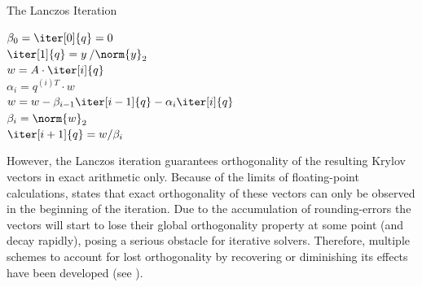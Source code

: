 \begin{algorithm}[h]
  \caption{The Lanczos Iteration}
  \label{alg:lanczos}
  \SetAlgoLined
  $\beta_0= \iter[0]{q} =0 $\\
  $\iter[1]{q}= y\:/\norm{y}_2$ \\
   {
    $w =A\cdot \iter[i]{q}$ \\
    $\alpha_i = q^{(i)T}\cdot w$ \\
    $w = w -\beta_{i-1}\iter[i-1]{q}-\alpha_i\iter[i]{q}$ \\
    $\beta_i = \norm{w}_2$ \\
    $\iter[i+1]{q} = w/\beta_i$
  }
\end{algorithm}

However, the Lanczos iteration guarantees orthogonality of the resulting Krylov vectors in exact arithmetic only. Because of the limits of floating-point calculations, \cite{saad_gmres_1986} states that exact orthogonality of these vectors can only be observed in the beginning of the iteration. Due to the accumulation of rounding-errors the vectors will start to lose their global orthogonality property at some point (and decay rapidly), posing a serious obstacle for iterative solvers. Therefore, multiple schemes to account for lost orthogonality by recovering or diminishing its effects have been developed (see \cite{parlett_beresford_n_13_1998}).

